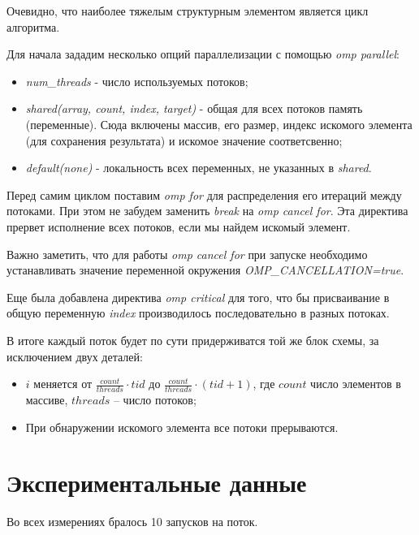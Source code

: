 \documentclass[a4paper, 12pt]{article}
\begin{document}
Очевидно, что наиболее тяжелым структурным элементом является цикл алгоритма.

Для начала зададим несколько опций параллелизации с помощью \textit{omp parallel}:
\begin{itemize}
 \item \textit{num\_threads} - число используемых потоков;
 \item \textit{shared(array, count, index, target)} - общая для всех потоков память (переменные). Сюда включены массив, его размер, индекс искомого элемента (для сохранения результата) и искомое значение соответсвенно;
 \item \textit{default(none)} - локальность всех переменных, не указанных в \textit{shared}.
\end{itemize}

Перед самим циклом поставим \textit{omp for} для распределения его итераций между потоками. При этом не забудем заменить \textit{break} на \textit{omp cancel for}. Эта директива прервет исполнение всех потоков, если мы найдем искомый элемент.

Важно заметить, что для работы \textit{omp cancel for} при запуске необходимо устанавливать значение переменной окружения \textit{OMP\_CANCELLATION=true}.

Еще была добавлена директива \textit{omp critical} для того, что бы присваивание в общую переменную \textit{index} производилось последовательно в разных потоках.

В итоге каждый поток будет по сути придерживатся той же блок схемы, за исключением двух деталей:
\begin{itemize}
 \item $i$ меняется от $\frac{count}{threads} \cdot tid$ до $\frac{count}{threads} \cdot (tid + 1)$, где $count$ число элементов в массиве, $threads$ -- число потоков;
 \item При обнаружении искомого элемента все потоки прерываются.
\end{itemize}



\section{Экспериментальные данные}

Во всех измерениях бралось 10 запусков на поток.

\vspace{0.3cm}
\end{document}
